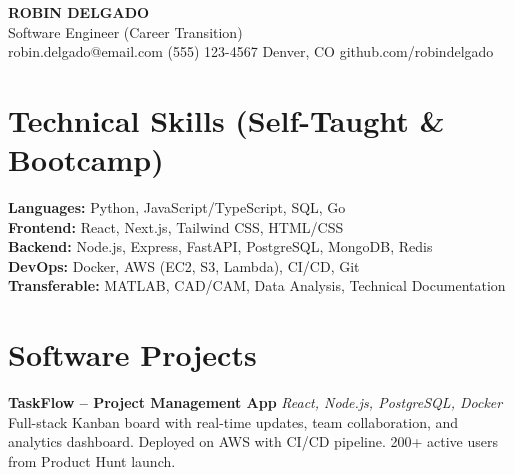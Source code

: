 \documentclass[11pt,a4paper]{article}
\begin{document}
\begin{center}
{\Huge\bfseries\color{accent} ROBIN DELGADO}\\[0.3em]
{\large Software Engineer (Career Transition)}\\[0.3em]
{\small robin.delgado@email.com \quad\textcolor{accent}{\textbullet}\quad (555) 123-4567 \quad\textcolor{accent}{\textbullet}\quad Denver, CO \quad\textcolor{accent}{\textbullet}\quad github.com/robindelgado}
\end{center}

\vspace{0.3em}

\noindent
{}

\section{Technical Skills (Self-Taught \& Bootcamp)}
\noindent\textbf{Languages:} Python, JavaScript/TypeScript, SQL, Go\\
\textbf{Frontend:} React, Next.js, Tailwind CSS, HTML/CSS\\
\textbf{Backend:} Node.js, Express, FastAPI, PostgreSQL, MongoDB, Redis\\
\textbf{DevOps:} Docker, AWS (EC2, S3, Lambda), CI/CD, Git\\
\textbf{Transferable:} MATLAB, CAD/CAM, Data Analysis, Technical Documentation

\section{Software Projects}

\noindent\textbf{TaskFlow -- Project Management App} \hfill \textit{React, Node.js, PostgreSQL, Docker}\\
{\small Full-stack Kanban board with real-time updates, team collaboration, and analytics dashboard. Deployed on AWS with CI/CD pipeline. 200+ active users from Product Hunt launch.}
\vspace{0.4em}
\end{document}

